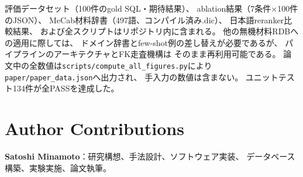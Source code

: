 \documentclass[5p,twocolumn]{elsarticle}
\begin{document}
評価データセット（100件のgold SQL・期待結果）、
ablation結果（7条件$\times$100件のJSON）、
MeCab材料辞書（497語、コンパイル済み.dic）、
日本語reranker比較結果、
および全スクリプトはリポジトリ内に含まれる。
他の無機材料RDBへの適用に際しては、
ドメイン辞書とfew-shot例の差し替えが必要であるが、
パイプラインのアーキテクチャとFK走査機構は
そのまま再利用可能である。
論文中の全数値は\texttt{scripts/compute\_all\_figures.py}により
\texttt{paper/paper\_data.json}へ出力され、
手入力の数値は含まない。
ユニットテスト134件が全PASSを達成した。

\section*{Author Contributions}

\textbf{Satoshi Minamoto}：研究構想、手法設計、ソフトウェア実装、
データベース構築、実験実施、論文執筆。


\end{document}
